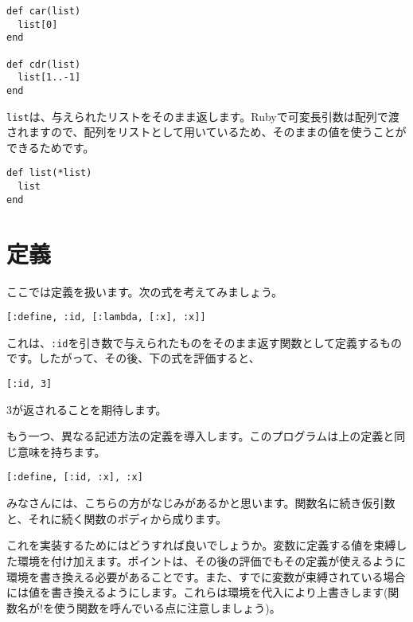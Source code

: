 \begin{lstlisting}
def car(list)
  list[0]
end

def cdr(list)
  list[1..-1]
end
\end{lstlisting}

{\tt list}は、与えられたリストをそのまま返します。Rubyで可変長引数は配列で渡されますので、配列をリストとして用いているため、そのままの値を使うことができるためです。

\begin{lstlisting}
def list(*list)
  list
end
\end{lstlisting}


\section{定義}

ここでは定義を扱います。次の式を考えてみましょう。
\begin{lstlisting}
[:define, :id, [:lambda, [:x], :x]]
\end{lstlisting}

これは、{\tt :id}を引き数で与えられたものをそのまま返す関数として定義するものです。したがって、その後、下の式を評価すると、
\begin{lstlisting}
[:id, 3]
\end{lstlisting}
3が返されることを期待します。

もう一つ、異なる記述方法の定義を導入します。このプログラムは上の定義と同じ意味を持ちます。
\begin{lstlisting}
[:define, [:id, :x], :x]
\end{lstlisting}

みなさんには、こちらの方がなじみがあるかと思います。関数名に続き仮引数と、それに続く関数のボディから成ります。

これを実装するためにはどうすれば良いでしょうか。変数に定義する値を束縛した環境を付け加えます。ポイントは、その後の評価でもその定義が使えるように環境を書き換える必要があることです。また、すでに変数が束縛されている場合には値を書き換えるようにします。これらは環境を代入により上書きします(関数名が!を使う関数を呼んでいる点に注意しましょう)。

